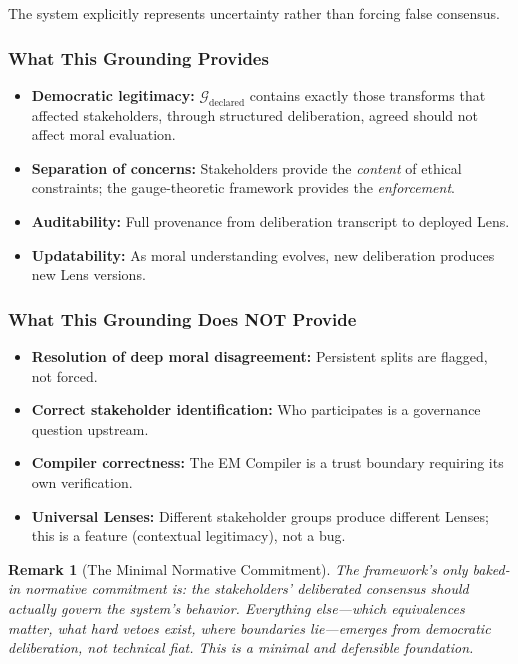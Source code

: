 \documentclass[12pt]{article}
\newtheorem{remark}[theorem]{Remark}
\begin{document}
The system explicitly represents uncertainty rather than forcing false consensus.

\subsubsection{What This Grounding Provides}

\begin{itemize}
\item \textbf{Democratic legitimacy:} $\mathcal{G}_{\text{declared}}$ contains exactly those transforms that affected stakeholders, through structured deliberation, agreed should not affect moral evaluation.
\item \textbf{Separation of concerns:} Stakeholders provide the \emph{content} of ethical constraints; the gauge-theoretic framework provides the \emph{enforcement}.
\item \textbf{Auditability:} Full provenance from deliberation transcript to deployed Lens.
\item \textbf{Updatability:} As moral understanding evolves, new deliberation produces new Lens versions.
\end{itemize}

\subsubsection{What This Grounding Does NOT Provide}

\begin{itemize}
\item \textbf{Resolution of deep moral disagreement:} Persistent splits are flagged, not forced.
\item \textbf{Correct stakeholder identification:} Who participates is a governance question upstream.
\item \textbf{Compiler correctness:} The EM Compiler is a trust boundary requiring its own verification.
\item \textbf{Universal Lenses:} Different stakeholder groups produce different Lenses; this is a feature
(contextual legitimacy), not a bug.
\end{itemize}

\begin{remark}[The Minimal Normative Commitment]
\emph{The framework's only baked-in normative
commitment is: the stakeholders' deliberated consensus should actually govern the system's behavior.
Everything else---which equivalences matter, what hard vetoes exist, where boundaries lie---emerges
from democratic deliberation, not technical fiat. This is a minimal and defensible foundation.}
\end{remark}
\end{document}

